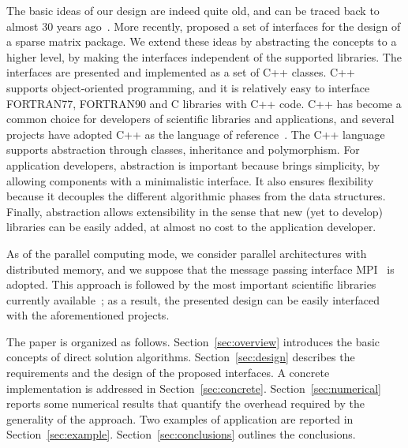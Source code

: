 \documentclass[acmtocl]{acmtrans2m}
\begin{document}
The basic ideas of our design are indeed quite old, and can be traced back to
almost 30 years ago~\cite{duff79performance}. More recently,
\cite{george99object} proposed a set of interfaces for the design of a
sparse matrix package. We extend these ideas by abstracting the concepts to
a higher level, by making the interfaces independent of the supported
libraries. The interfaces are presented and implemented as a
set of C++ classes.  C++~\cite{cppbook}
supports object-oriented programming, and it is relatively easy to interface
FORTRAN77, FORTRAN90 and C libraries with C++ code. C++ has become a common
choice for developers  of scientific libraries and applications, and several
projects have adopted C++ as the language of
reference~\cite{heroux05trilinos}. The C++ language
supports abstraction through classes, inheritance and polymorphism. For
application developers, abstraction is important because brings simplicity,
by allowing components with a minimalistic interface. It also ensures flexibility
because it decouples the different algorithmic phases from the data structures.
Finally, abstraction allows extensibility in the sense that new (yet to
                                                                develop)
libraries can be easily added, at almost no cost to the application developer.

%
%
As of the parallel computing mode, 
we consider parallel architectures with distributed memory, and we suppose
that the message passing interface MPI~\cite{gropp98mpi} is adopted.
This approach is followed by the most important scientific libraries currently
available~\cite{heroux05trilinos,petsc-user-ref,falgout02hypre}; as a result, the presented
design can be easily interfaced with the aforementioned projects.

\smallskip

The paper is organized as follows. Section~\ref{sec:overview} introduces the
basic concepts of direct solution algorithms. Section~\ref{sec:design}
describes the requirements and the design of the proposed
interfaces. A concrete implementation is addressed in
Section~\ref{sec:concrete}. Section~\ref{sec:numerical} reports some
numerical results that quantify the overhead required by the generality of
the approach. Two
examples of application are reported in Section~\ref{sec:example}.
Section~\ref{sec:conclusions} outlines the conclusions.

\end{document}
